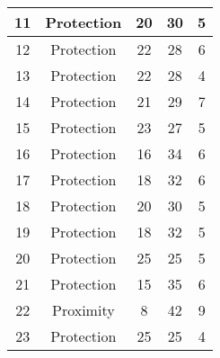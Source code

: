 \documentclass[results.tex]{subfiles}
\begin{document}
\begin{center}
\begin{tabular}{| c || c | c | c | c |}
            \hline
            11                      & Protection                   & 20                     & 30                      & 5                    \\
            \hline
            12                      & Protection                   & 22                     & 28                      & 6                    \\
            \hline
            13                      & Protection                   & 22                     & 28                      & 4                    \\
            \hline
            14                      & Protection                   & 21                     & 29                      & 7                    \\
            \hline
            15                      & Protection                   & 23                     & 27                      & 5                    \\
            \hline
            16                      & Protection                   & 16                     & 34                      & 6                    \\
            \hline
            17                      & Protection                   & 18                     & 32                      & 6                    \\
            \hline
            18                      & Protection                   & 20                     & 30                      & 5                    \\
            \hline
            19                      & Protection                   & 18                     & 32                      & 5                    \\
            \hline
            20                      & Protection                   & 25                     & 25                      & 5                    \\
            \hline
            21                      & Protection                   & 15                     & 35                      & 6                    \\
            \hline
            22                      & Proximity                    & 8                      & 42                      & 9                    \\
            \hline
            23                      & Protection                   & 25                     & 25                      & 4                    \\

\end{tabular}
\end{center}
\end{document}
